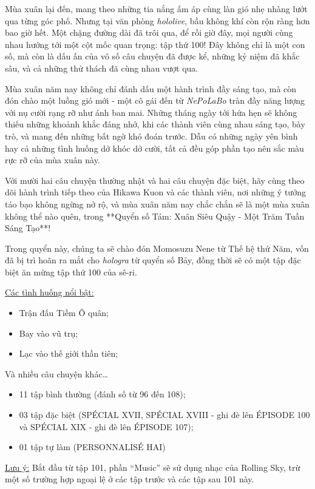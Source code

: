 \documentclass[main.tex]{subfiles}
\begin{document}
Mùa xuân lại đến, mang theo những tia nắng ấm áp cùng làn gió nhẹ nhàng lướt qua từng góc phố. Nhưng tại văn phòng \textit{hololive}, bầu không khí còn rộn ràng hơn bao giờ hết. Một chặng đường dài đã trôi qua, để rồi giờ đây, mọi người cùng nhau hướng tới một cột mốc quan trọng: tập thứ 100! Đây không chỉ là một con số, mà còn là dấu ấn của vô số câu chuyện đã được kể, những kỷ niệm đã khắc sâu, và cả những thử thách đã cùng nhau vượt qua.

Mùa xuân năm nay không chỉ đánh dấu một hành trình đầy sáng tạo, mà còn đón chào một luồng gió mới - một cô gái đến từ \textit{NePoLaBo} tràn đầy năng lượng với nụ cười rạng rỡ như ánh ban mai. Những tháng ngày tới hứa hẹn sẽ không thiếu những khoảnh khắc đáng nhớ, khi các thành viên cùng nhau sáng tạo, bày trò, và mang đến những bất ngờ khó đoán trước. Dẫu có những ngày yên bình hay cả những tình huống dở khóc dở cười, tất cả đều góp phần tạo nên sắc màu rực rỡ của mùa xuân này.

Với mười hai câu chuyện thường nhật và hai câu chuyện đặc biệt, hãy cùng theo dõi hành trình tiếp theo của Hikawa Kuon và các thành viên, nơi những ý tưởng táo bạo không ngừng nở rộ, và mùa xuân năm nay chắc chắn sẽ là một mùa xuân không thể nào quên, trong **Quyển số Tám: Xuân Siêu Quậy - Một Trăm Tuần Sáng Tạo**!

Trong quyển này, chúng ta sẽ chào đón Momosuzu Nene từ Thế hệ thứ Năm, vốn đã bị trì hoãn ra mắt cho \textit{hologra} từ quyển số Bảy, đồng thời sẽ có một tập đặc biệt ăn mừng tập thứ 100 của sê-ri.

\underline{Các tình huống nổi bật:}
\begin{itemize}
  \item Trận đấu Tiềm Ô quân;
  \item Bay vào vũ trụ;
  \item Lạc vào thế giới thần tiên;
\end{itemize}
Và nhiều câu chuyện khác\dots

{}
\begin{itemize}
  \item 11 tập bình thường (đánh số từ 96 đến 108);
  \item 03 tập đặc biệt ({\flaregothic SPÉCIAL {\ab XVII}}, {\flaregothic SPÉCIAL {\ab XVIII}} - ghi đè lên {\flaregothic ÉPISODE 100} và {\flaregothic SPÉCIAL {\ab XIX}} - ghi đè lên {\flaregothic ÉPISODE 107});
  \item 01 tập tự làm ({\flaregothic PERSONNALISÉ {\vnmdisp HAI}})
\end{itemize}

\underline{Lưu ý:}  Bắt đầu từ tập 101, phần ``Music'' sẽ sử dụng nhạc của {\sen Rolling Sky}, trừ một số trường hợp ngoại lệ ở các tập trước và các tập sau 101 này.
\end{document}

